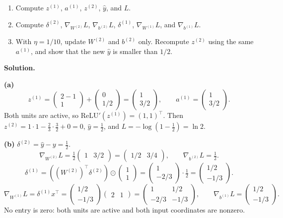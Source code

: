 \begin{enumerate}[label=(\alph*)]
\item Compute $z^{(1)}$, $a^{(1)}$, $z^{(2)}$, $\hat y$, and $L$.
\item Compute $\delta^{(2)}$, $\nabla_{W^{(2)}}L$, $\nabla_{b^{(2)}}L$, $\delta^{(1)}$, $\nabla_{W^{(1)}}L$, and $\nabla_{b^{(1)}}L$.
\item With $\eta = 1/10$, update $W^{(2)}$ and $b^{(2)}$ only. Recompute $z^{(2)}$ using the same $a^{(1)}$, and show that the new $\hat y$ is smaller than $1/2$.
\end{enumerate}

\textbf{Solution.}

\textbf{(a)}
\[
z^{(1)} = \begin{pmatrix}2 - 1\\ 1\end{pmatrix} + \begin{pmatrix}0\\1/2\end{pmatrix} = \begin{pmatrix}1\\3/2\end{pmatrix},\qquad a^{(1)} = \begin{pmatrix}1\\3/2\end{pmatrix}.
\]
Both units are active, so $\mathrm{ReLU}'(z^{(1)}) = (1,1)^\top$. Then $z^{(2)} = 1\cdot1 - \tfrac23\cdot\tfrac32 + 0 = 0$, $\hat y = \tfrac12$, and $L = -\log(1 - \tfrac12) = \ln 2$.

\textbf{(b)} $\delta^{(2)} = \hat y - y = \tfrac12$.
\[
\nabla_{W^{(2)}}L = \tfrac12\begin{pmatrix}1 & 3/2\end{pmatrix} = \begin{pmatrix}1/2 & 3/4\end{pmatrix},\qquad \nabla_{b^{(2)}}L = \tfrac12.
\]
\[
\delta^{(1)} = \left((W^{(2)})^\top\delta^{(2)}\right)\odot\begin{pmatrix}1\\1\end{pmatrix} = \begin{pmatrix}1\\-2/3\end{pmatrix}\cdot\tfrac12 = \begin{pmatrix}1/2\\-1/3\end{pmatrix}.
\]
\[
\nabla_{W^{(1)}}L = \delta^{(1)}x^\top = \begin{pmatrix}1/2\\-1/3\end{pmatrix}\begin{pmatrix}2 & 1\end{pmatrix} = \begin{pmatrix}1 & 1/2\\ -2/3 & -1/3\end{pmatrix},\qquad \nabla_{b^{(1)}}L = \begin{pmatrix}1/2\\-1/3\end{pmatrix}.
\]
No entry is zero: both units are active and both input coordinates are nonzero.

